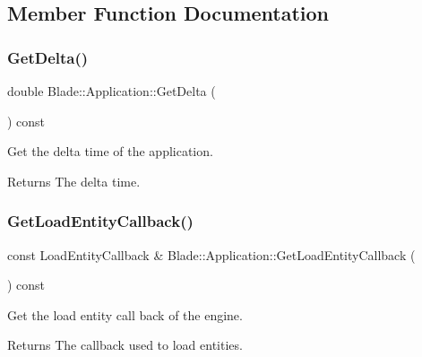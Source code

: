 \subsection{Member Function Documentation}
\mbox{\label{class_blade_1_1_application_a8e144f5f05fc638339fc19afe142bbab}} 
\subsubsection{\texorpdfstring{Get\+Delta()}{GetDelta()}}
{\footnotesize\ttfamily double Blade\+::\+Application\+::\+Get\+Delta (\begin{DoxyParamCaption}{ }\end{DoxyParamCaption}) const\hspace{0.3cm}{\ttfamily [noexcept]}}



Get the delta time of the application. 

\begin{DoxyReturn}{Returns}
The delta time. 
\end{DoxyReturn}
\mbox{\label{class_blade_1_1_application_ac5964be32df8e0787b832896c0811ae6}} 
\subsubsection{\texorpdfstring{Get\+Load\+Entity\+Callback()}{GetLoadEntityCallback()}}
{\footnotesize\ttfamily const Load\+Entity\+Callback \& Blade\+::\+Application\+::\+Get\+Load\+Entity\+Callback (\begin{DoxyParamCaption}{ }\end{DoxyParamCaption}) const\hspace{0.3cm}{\ttfamily [noexcept]}}



Get the load entity call back of the engine. 

\begin{DoxyReturn}{Returns}
The callback used to load entities. 
\end{DoxyReturn}
\mbox{\label{class_blade_1_1_application_a0fd401f7a7ea78a8d222ccc920cb1968}} 
